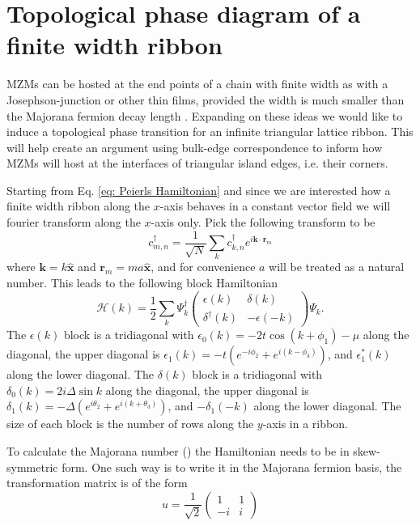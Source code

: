 \documentclass[aps,prb,showpacs,amsmath,amssymb,superscriptaddress]{revtex4-2}
\let\oldhat\hat
\renewcommand{\hat}[1]{\oldhat{\mathbf{#1}}}
\renewcommand{\vec}[1]{\mathbf{#1}}
\newcommand{\ham}{\mathcal{H}}
\newcommand{\cc}{c^{\dagger}}
\newcommand{\de}{\Delta}
\begin{document}
\section{Topological phase diagram of a finite width ribbon}

MZMs can be hosted at the end points of a chain with finite width as with a Josephson-junction or other thin films, provided the width is much smaller than the Majorana fermion decay length \cite{black-schafferMajoranaFermionsSpinorbitcoupled2011, pientkaSignaturesTopologicalPhase2013, hellTwoDimensionalPlatformNetworks2017, scharfTuningTopologicalSuperconductivity2019, potterMultichannelGeneralizationKitaev2010}.
Expanding on these ideas we would like to induce a topological phase transition for an infinite triangular lattice ribbon.
This will help create an argument using bulk-edge correspondence to inform how MZMs will host at the interfaces of triangular island edges, i.e. their corners.

Starting from Eq. \ref{eq: Peierls Hamiltonian} and since we are interested how a finite width ribbon along the $x$-axis behaves in a constant vector field we will fourier transform along the $x$-axis only.
Pick the following transform to be
\begin{equation}
  \cc_{m,n} = \dfrac{1}{\sqrt{N}} \sum_{k} \cc_{k,n} e^{i \vec{k}\cdot\vec{r}_m}
\end{equation}
where $\vec{k}=k\hat{x}$ and $\vec{r}_m = ma\hat{x}$, and for convenience $a$ will be treated as a natural number.
This leads to the following block Hamiltonian
\begin{equation}
  \ham(k) = \dfrac{1}{2} \sum_k \Psi_k^\dagger \left(
    \begin{matrix}
      \epsilon(k) & \delta(k) \\
      \delta^\dagger(k) & -\epsilon(-k)
    \end{matrix} \right)
    \Psi_k.
\end{equation}
The $\epsilon(k)$ block is a tridiagonal with $\epsilon_0(k) = -2t\cos(k+\phi_1) - \mu$ along the diagonal, the upper diagonal is  $\epsilon_1(k) = -t(e^{-i\phi_2}+e^{i(k-\phi_3)})$, and $\epsilon_1^*(k)$ along the lower diagonal.
The $\delta(k)$ block is a tridiagonal with $\delta_0(k) = 2i\de \sin k $ along the diagonal, the upper diagonal is  $\delta_1(k) = -\de (e^{i\theta_2}+e^{i(k+\theta_3)})$, and $-\delta_1(-k)$ along the lower diagonal.
The size of each block is the number of rows along the $y$-axis in a ribbon.

To calculate the Majorana number () the Hamiltonian needs to be in skew-symmetric form.
One such way is to write it in the Majorana fermion basis, the transformation matrix is of the form
\begin{equation}
  u = \dfrac{1}{\sqrt{2}} \left(
  \begin{matrix}
    1 & 1 \\
    -i & i
  \end{matrix} \right)
\end{equation}
\end{document}
